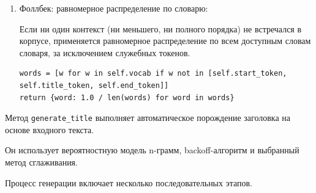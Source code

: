 \documentclass[coursework]{SCWorks}
\begin{document}
\begin{enumerate}
        Если ни один след за данным контекстом не зафиксирован, модель постепенно сокращает контекст, удаляя первый токен.

        Процесс продолжается, пока:
        \begin{enumerate}
            \item не будет найдено подходящее состояние;
            \item или не будет достигнута максимальная глубина отката;
            \item или контекст не станет однословным.
        \end{enumerate}

        \begin{verbatim}
if len(current_context) > 1:
    current_context = current_context[1:]
else:
    break
depth += 1
        \end{verbatim}
        \item Фоллбек: равномерное распределение по словарю:

        Если ни один контекст (ни меньшего, ни полного порядка) не встречался в корпусе, применяется равномерное распределение
        по всем доступным словам словаря, за исключением служебных токенов.

        \begin{verbatim}
words = [w for w in self.vocab if w not in [self.start_token, self.title_token, self.end_token]]
return {word: 1.0 / len(words) for word in words}
        \end{verbatim}
    \end{enumerate}

    Метод \texttt{generate\_title} выполняет автоматическое порождение заголовка на основе входного текста.

    Он использует вероятностную модель n-грамм, backoff-алгоритм и выбранный метод сглаживания.

    Процесс генерации включает несколько последовательных этапов.
\end{document}

